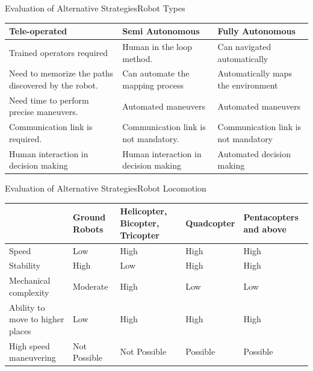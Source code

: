\documentclass[xcolor=table]{beamer}
\begin{document}
\begin{frame}{Evaluation of Alternative Strategies}{Robot Types}
  \begin{footnotesize}
  \begin{center}
  \setlength{\arrayrulewidth}{0.2mm}
  \setlength{\tabcolsep}{5pt}
  \renewcommand{\arraystretch}{1.2}
 
  \begin{tabular}{ |p{3.55cm}|s|p{3.55cm}| }
  \hline
  \textbf{Tele-operated}&\textbf{Semi Autonomous}&\textbf{Fully Autonomous}\\
  \hline
  Trained operators required & Human in the loop method. & Can navigated automatically \\
  \hline
  Need to memorize the paths discovered by the robot. & Can automate the mapping process & Automatically maps the environment \\
  \hline
  Need time to perform precise maneuvers.  & Automated maneuvers & Automated maneuvers \\
  \hline
  Communication link is required. & Communication link is not mandatory. & Communication link is not mandatory \\
  \hline
  Human interaction in decision making & Human interaction in decision making & Automated decision making \\
  \hline
  \end{tabular}
  \end{center}
  \end{footnotesize}
\end{frame}

\begin{frame}{Evaluation of Alternative Strategies}{Robot Locomotion}
  \begin{footnotesize}
  \begin{center}
  \setlength{\arrayrulewidth}{0.2mm}
  \setlength{\tabcolsep}{5pt}
  \renewcommand{\arraystretch}{1.2}
 
  \begin{tabular}{ |p{2cm}|p{2cm}|p{2cm}|s|p{2cm}| }
  \hline
  &\textbf{Ground Robots}&\textbf{Helicopter, Bicopter, Tricopter}&\textbf{Quadcopter}&\textbf{Pentacopters and above}\\
  \hline
  Speed & Low & High & High & High \\
  \hline
  Stability & High & Low & High & High \\
  \hline
  Mechanical complexity & Moderate & High & Low & Low \\
  \hline
  Ability to move to higher places & Low & High & High & High \\
  \hline
  High speed maneuvering & Not Possible & Not Possible & Possible & Possible \\
  \hline
  \end{tabular}
  \end{center}
  \end{footnotesize}
\end{frame}
\end{document}
